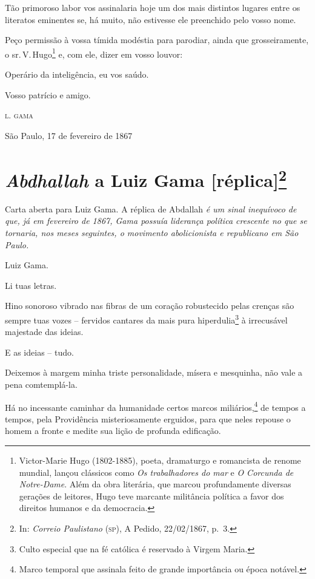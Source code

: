 Tão primoroso labor vos assinalaria hoje um dos mais distintos lugares
entre os literatos eminentes se, há muito, não estivesse ele preenchido
pelo vosso nome.

Peço permissão à vossa tímida modéstia para parodiar, ainda que
grosseiramente, o sr.\,V.\,Hugo\footnote{Victor-Marie Hugo (1802-1885),
  poeta, dramaturgo e romancista de renome mundial, lançou clássicos
  como \emph{Os trabalhadores do mar} e \emph{O Corcunda de Notre-Dame}.
  Além da obra literária, que marcou profundamente diversas gerações de
  leitores, Hugo teve marcante militância política a favor dos direitos
  humanos e da democracia.}\label{victor hugo} e, com ele, dizer em vosso louvor:

Operário da inteligência, eu vos saúdo.

Vosso patrício e amigo.

\begin{flushright}
\textsc{l. gama}

São Paulo, 17 de fevereiro de 1867
\end{flushright}

\chapter{\emph{Abdhallah} a Luiz Gama {[}réplica{]}\footnote{In:
  \emph{Correio Paulistano} (\textsc{sp}), A Pedido, 22/02/1867, p.~3.}}

\begin{didascalia}
Carta aberta para Luiz Gama. A réplica de Abdallah \emph{é um sinal
inequívoco de que, já em fevereiro de 1867, Gama possuía liderança
política crescente no que se tornaria, nos meses seguintes, o movimento
abolicionista e republicano em São Paulo.}
\end{didascalia}




Luiz Gama.

Li tuas letras.

Hino sonoroso vibrado nas fibras de um coração robustecido pelas crenças
são sempre tuas vozes -- fervidos cantares da mais pura
hiperdulia\footnote{Culto especial que na fé católica é reservado à
  Virgem Maria.} à irrecusável majestade das ideias.

E as ideias -- tudo.

Deixemos à margem minha triste personalidade, mísera e mesquinha, não
vale a pena comtemplá-la.

Há no incessante caminhar da humanidade certos marcos
miliários,\footnote{Marco temporal que assinala feito de grande
  importância ou época notável.} de tempos a tempos, pela Providência
misteriosamente erguidos, para que neles repouse o homem a fronte e
medite sua lição de profunda edificação.

